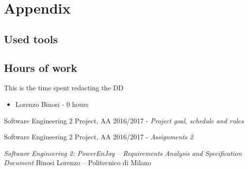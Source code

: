 \appendix

\section{Appendix}

\subsection{Used tools}

\subsection{Hours of work}
This is the time spent redacting the DD
\begin{itemize}
	\item {Lorenzo Binosi} - 0 hours
\end{itemize}

\begin{thebibliography}{1}	
	Software Engineering 2 Project, AA 2016/2017 - \emph{Project goal, schedule and rules}
	
	Software Engineering 2 Project, AA 2016/2017 - \emph{Assignments 2}

        	\emph{Software Engineering 2: PowerEnJoy –
        	Requirements Analysis and Specification Document}
        	Binosi Lorenzo – Politecnico di Milano
\end{thebibliography}